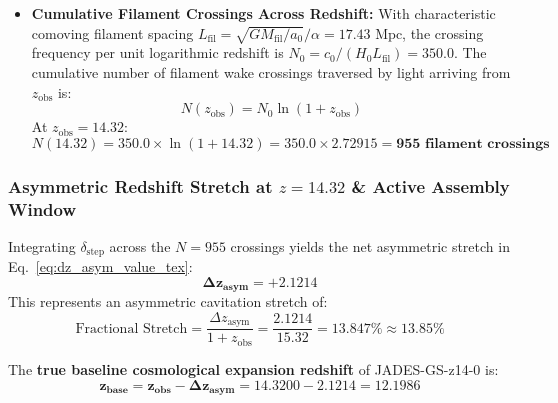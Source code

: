 \documentclass[11pt,a4paper]{article}
\begin{document}
\begin{itemize}
    \begin{equation}
    \delta_{\text{step}} = \frac{2\Phi_{\text{well}}}{c_0^2} \cdot \frac{1}{\alpha - 1} = \frac{2(306,060)^2}{(2.99792 \times 10^8)^2} \cdot \frac{1}{1.635} = \mathbf{1.274 \times 10^{-6}}
    \end{equation}
    \item \textbf{Cumulative Filament Crossings Across Redshift:} With characteristic comoving filament spacing $L_{\text{fil}} = \sqrt{G M_{\text{fil}} / a_0} / \alpha = 17.43\text{ Mpc}$, the crossing frequency per unit logarithmic redshift is $N_0 = c_0 / (H_0 L_{\text{fil}}) = 350.0$. The cumulative number of filament wake crossings traversed by light arriving from $z_{\text{obs}}$ is:
    \begin{equation}
    N(z_{\text{obs}}) = N_0 \ln(1 + z_{\text{obs}})
    \end{equation}
    At $z_{\text{obs}} = 14.32$:
    \begin{equation}
    N(14.32) = 350.0 \times \ln(1 + 14.32) = 350.0 \times 2.72915 = \mathbf{955\text{ filament crossings}}
    \end{equation}
\end{itemize}

\subsubsection{Asymmetric Redshift Stretch at $z = 14.32$ \& Active Assembly Window}
\label{subsubsec:stretch_at_z14}

Integrating $\delta_{\text{step}}$ across the $N = 955$ crossings yields the net asymmetric stretch in Eq.~\eqref{eq:dz_asym_value_tex}:
\begin{equation}
\mathbf{\Delta z_{\text{asym}} = +2.1214}
\label{eq:dz_asym_value_tex}
\end{equation}
This represents an asymmetric cavitation stretch of:
\begin{equation}
\text{Fractional Stretch} = \frac{\Delta z_{\text{asym}}}{1 + z_{\text{obs}}} = \frac{2.1214}{15.32} = \mathbf{13.847\% \approx 13.85\%}
\end{equation}

The \textbf{true baseline cosmological expansion redshift} of JADES-GS-z14-0 is:
\begin{equation}
\mathbf{z_{\text{base}} = z_{\text{obs}} - \Delta z_{\text{asym}} = 14.3200 - 2.1214 = 12.1986}
\end{equation}
\end{document}
